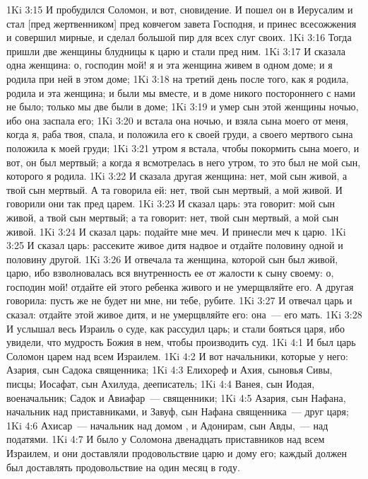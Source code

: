\vs 1Ki 3:15 И пробудился Соломон, и вот,  сновидение. И пошел он в Иерусалим и стал [пред жертвенником] пред ковчегом завета Господня, и принес всесожжения и совершил  мирные, и сделал большой пир для всех слуг своих.
\rsbpar\vs 1Ki 3:16 Тогда пришли две женщины блудницы к царю и стали пред ним.
\vs 1Ki 3:17 И сказала одна женщина: о, господин мой! я и эта женщина живем в одном доме; и я родила при ней в этом доме;
\vs 1Ki 3:18 на третий день после того, как я родила, родила и эта женщина; и были мы вместе, и в доме никого постороннего с нами не было; только мы две были в доме;
\vs 1Ki 3:19 и умер сын этой женщины ночью, ибо она заспала его;
\vs 1Ki 3:20 и встала она ночью, и взяла сына моего от меня, когда я, раба твоя, спала, и положила его к своей груди, а своего мертвого сына положила к моей груди;
\vs 1Ki 3:21 утром я встала, чтобы покормить сына моего, и вот, он был мертвый; а когда я всмотрелась в него утром, то это был не мой сын, которого я родила.
\vs 1Ki 3:22 И сказала другая женщина: нет, мой сын живой, а твой сын мертвый. А та говорила ей: нет, твой сын мертвый, а мой живой. И говорили они так пред царем.
\vs 1Ki 3:23 И сказал царь: эта говорит: мой сын живой, а твой сын мертвый; а та говорит: нет, твой сын мертвый, а мой сын живой.
\vs 1Ki 3:24 И сказал царь: подайте мне меч. И принесли меч к царю.
\vs 1Ki 3:25 И сказал царь: рассеките живое дитя надвое и отдайте половину одной и половину другой.
\vs 1Ki 3:26 И отвечала та женщина, которой сын был живой, царю, ибо взволновалась вся внутренность ее от жалости к сыну своему: о, господин мой! отдайте ей этого ребенка живого и не умерщвляйте его. А другая говорила: пусть же не будет ни мне, ни тебе, рубите.
\vs 1Ki 3:27 И отвечал царь и сказал: отдайте этой живое дитя, и не умерщвляйте его: она~--- его мать.
\vs 1Ki 3:28 И услышал весь Израиль о суде, как рассудил царь; и стали бояться царя, ибо увидели, что мудрость Божия в нем, чтобы производить суд.
\vs 1Ki 4:1 И был царь Соломон царем над всем Израилем.
\vs 1Ki 4:2 И вот начальники, которые  у него: Азария, сын Садока священника;
\vs 1Ki 4:3 Елихореф и Ахия, сыновья Сивы, писцы; Иосафат, сын Ахилуда, дееписатель;
\vs 1Ki 4:4 Ванея, сын Иодая, военачальник; Садок и Авиафар~--- священники;
\vs 1Ki 4:5 Азария, сын Нафана, начальник над приставниками, и Завуф, сын Нафана священника~--- друг царя;
\vs 1Ki 4:6 Ахисар~--- начальник над домом , и Адонирам, сын Авды,~--- над податями.
\rsbpar\vs 1Ki 4:7 И было у Соломона двенадцать приставников над всем Израилем, и они доставляли продовольствие царю и дому его; каждый должен был доставлять продовольствие на один месяц в году.
